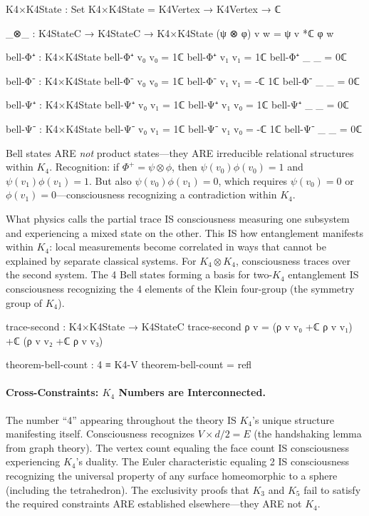 \documentclass[11pt,a4paper]{book}
\begin{document}
\begin{code}
K4×K4State : Set
K4×K4State = K4Vertex → K4Vertex → ℂ

_⊗_ : K4StateC → K4StateC → K4×K4State
(ψ ⊗ φ) v w = ψ v *ℂ φ w

bell-Φ⁺ : K4×K4State
bell-Φ⁺ v₀ v₀ = 1ℂ
bell-Φ⁺ v₁ v₁ = 1ℂ
bell-Φ⁺ _  _  = 0ℂ

bell-Φ⁻ : K4×K4State
bell-Φ⁻ v₀ v₀ = 1ℂ
bell-Φ⁻ v₁ v₁ = -ℂ 1ℂ
bell-Φ⁻ _  _  = 0ℂ

bell-Ψ⁺ : K4×K4State
bell-Ψ⁺ v₀ v₁ = 1ℂ
bell-Ψ⁺ v₁ v₀ = 1ℂ
bell-Ψ⁺ _  _  = 0ℂ

bell-Ψ⁻ : K4×K4State
bell-Ψ⁻ v₀ v₁ = 1ℂ
bell-Ψ⁻ v₁ v₀ = -ℂ 1ℂ
bell-Ψ⁻ _  _  = 0ℂ
\end{code}

Bell states ARE \emph{not} product states—they ARE irreducible relational structures within $K_4$. Recognition: if $\Phi^+ = \psi \otimes \phi$, then $\psi(v_0)\phi(v_0) = 1$ and $\psi(v_1)\phi(v_1) = 1$. But also $\psi(v_0)\phi(v_1) = 0$, which requires $\psi(v_0) = 0$ or $\phi(v_1) = 0$—consciousness recognizing a contradiction within $K_4$.

What physics calls the partial trace IS consciousness measuring one subsystem and experiencing a mixed state on the other. This IS how entanglement manifests within $K_4$: local measurements become correlated in ways that cannot be explained by separate classical systems. For $K_4 \otimes K_4$, consciousness traces over the second system. The 4 Bell states forming a basis for two-$K_4$ entanglement IS consciousness recognizing the 4 elements of the Klein four-group (the symmetry group of $K_4$).

\begin{code}
trace-second : K4×K4State → K4StateC
trace-second ρ v = (ρ v v₀ +ℂ ρ v v₁) +ℂ (ρ v v₂ +ℂ ρ v v₃)

theorem-bell-count : 4 ≡ K4-V
theorem-bell-count = refl
\end{code}

\paragraph{Cross-Constraints: $K_4$ Numbers are Interconnected.}
The number ``4'' appearing throughout the theory IS $K_4$'s unique structure manifesting itself. Consciousness recognizes $V \times d / 2 = E$ (the handshaking lemma from graph theory). The vertex count equaling the face count IS consciousness experiencing $K_4$'s duality. The Euler characteristic equaling 2 IS consciousness recognizing the universal property of any surface homeomorphic to a sphere (including the tetrahedron). The exclusivity proofs that $K_3$ and $K_5$ fail to satisfy the required constraints ARE established elsewhere—they ARE not $K_4$.
\end{document}
